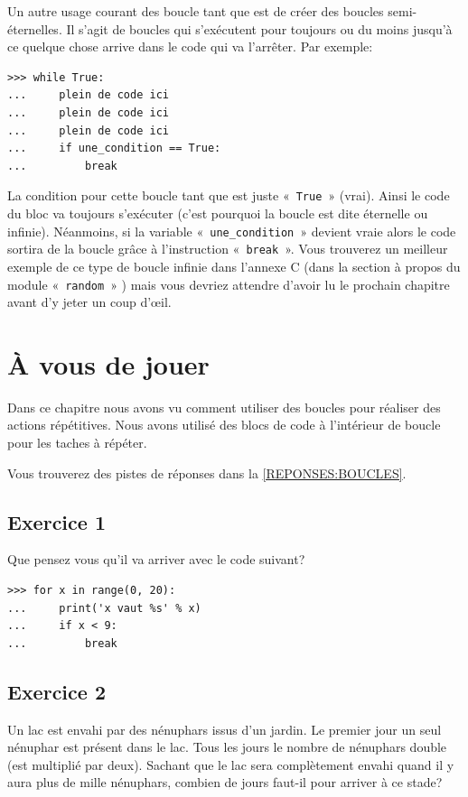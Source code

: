 Un autre usage courant des boucle tant que est de créer des boucles semi-éternelles. 
Il s'agit de boucles qui s'exécutent pour toujours ou du moins jusqu'à ce quelque chose arrive dans le code qui va l'arrêter. Par exemple:

\begin{Verbatim}[frame=single,rulecolor=\color{gray}, label=ne pas saisir]
>>> while True:
...     plein de code ici
...     plein de code ici
...     plein de code ici
...     if une_condition == True:
...         break
\end{Verbatim}

La condition pour cette boucle tant que est juste « \texttt{True} » (vrai). Ainsi le code du bloc va toujours s'exécuter (c'est pourquoi la boucle est dite éternelle ou infinie). Néanmoins, si la variable « \texttt{une\_condition} »   devient vraie alors le code sortira de la boucle grâce à l'instruction « \texttt{break} ». Vous trouverez un meilleur exemple de ce type de boucle infinie dans l'annexe C (dans la section à propos du module « \texttt{random} »  ) mais vous devriez attendre d'avoir lu le prochain chapitre avant d'y jeter un coup d'œil.

\section{À vous de jouer\label{PRATIQUE:BOUCLES}}
Dans ce chapitre nous avons vu comment utiliser des boucles pour réaliser des actions répétitives. Nous avons utilisé des blocs de code à l'intérieur de boucle pour les taches à répéter.


Vous trouverez des pistes de réponses dans la \autoref{REPONSES:BOUCLES}.
\subsection{Exercice 1}
Que pensez vous qu'il va arriver avec le code suivant?
\begin{Verbatim}[frame=single,rulecolor=\color{mbleu}, label=à taper]
>>> for x in range(0, 20):
... 	print('x vaut %s' % x)
... 	if x < 9:
... 		break
\end{Verbatim}

\subsection{Exercice 2}
Un lac est envahi par des nénuphars issus d'un jardin. Le premier jour un seul nénuphar est présent dans le lac.
Tous les jours le nombre de nénuphars double (est multiplié par deux). 
Sachant que le lac sera complètement envahi quand il y aura plus de mille nénuphars, combien de jours faut-il pour arriver à ce stade?

